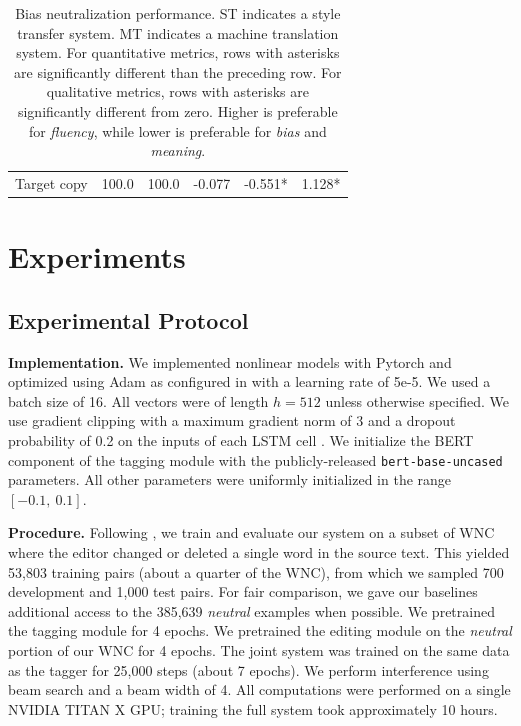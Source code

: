 \begin{table}[]
\begin{tabular}{l|ll|lll}
Target copy                                            & 100.0 & 100.0     & -0.077       &  -0.551*     &    1.128*              \\ %
\end{tabular}
\caption{Bias neutralization performance. ST indicates a style transfer system. MT indicates a machine translation system.  For quantitative metrics, rows with asterisks are significantly different than the preceding row. For qualitative metrics, rows with asterisks are significantly different from zero. Higher is preferable for \emph{fluency}, while lower is preferable for \emph{bias} and \emph{meaning}.}
\label{tab:editing}
\end{table}



\section{Experiments}
\label{section:experiments}

\subsection{Experimental Protocol}
\label{sub:setup}

\textbf{Implementation.} We implemented nonlinear models with Pytorch \cite{paszke2017automatic} and optimized using Adam \cite{kingma2014adam} as configured in \cite{devlin2018bert} with a learning rate of 5e-5. We used a batch size of 16. All vectors were of length $h = 512$ unless otherwise specified. We use gradient clipping with a maximum gradient norm of 3 and a dropout probability of 0.2 on the inputs of each LSTM cell \cite{srivastava2014dropout}. We initialize the BERT component of the tagging module with the publicly-released \texttt{bert-base-uncased} parameters. All other parameters were uniformly initialized in the range $[-0.1,\ 0.1]$.

\textbf{Procedure.} Following \citet{recasens2013linguistic}, we train and evaluate our system on a subset of WNC where the editor changed or deleted a single word in the source text. This yielded 53,803 training pairs (about a quarter of the WNC), from which we sampled 700 development and 1,000 test pairs. For fair comparison, we gave our baselines additional access to the 385,639 \emph{neutral} examples when possible. We pretrained the tagging module for 4 epochs. We pretrained the editing module on the \emph{neutral} portion of our WNC for 4 epochs. The joint system was trained on the same data as the tagger for 25,000 steps (about 7 epochs).  We perform interference using beam search and a beam width of 4. All computations were performed on a single NVIDIA TITAN X GPU; training the full system took approximately 10 hours.


